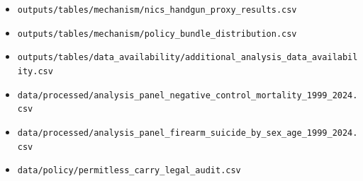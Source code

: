 \documentclass[10pt]{article}
\begin{document}
\begin{itemize}
\item \texttt{outputs/tables/mechanism/nics\_handgun\_proxy\_results.csv}
\item \texttt{outputs/tables/mechanism/policy\_bundle\_distribution.csv}
\item \texttt{outputs/tables/data\_availability/additional\_analysis\_data\_availability.csv}
\item \texttt{data/processed/analysis\_panel\_negative\_control\_mortality\_1999\_2024.csv}
\item \texttt{data/processed/analysis\_panel\_firearm\_suicide\_by\_sex\_age\_1999\_2024.csv}
\item \texttt{data/policy/permitless\_carry\_legal\_audit.csv}
\end{itemize}
\end{document}
